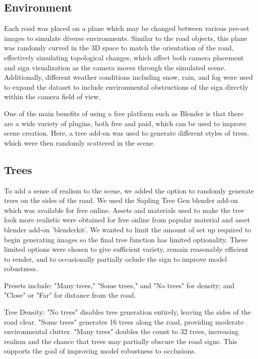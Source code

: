 \documentclass[journal]{IEEEtran}
\begin{document}
\subsection{Environment}
Each road was placed on a plane which may be changed between various pre-set images to simulate diverse environments. Similar to the road objects, this plane was randomly curved in the 3D space to match the orientation of the road, effectively simulating topological changes, which affect both camera placement and sign visualization as the camera moves through the simulated scene. Additionally, different weather conditions including snow, rain, and fog were used to expand the dataset to include environmental obstructions of the sign directly within the camera field of view. 

One of the main benefits of using a free platform such as Blender is that there are a wide variety of plugins, both free and paid, which can be used to improve scene creation. Here, a tree add-on was used to generate different styles of trees, which were then randomly scattered in the scene. 

\subsection{Trees}
To add a sense of realism to the scene, we added the option to randomly generate trees on the sides of the road. We used the Sapling Tree Gen blender add-on which was available for free online. Assets and materials used to make the tree look more realistic were obtained for free online from popular material and asset blender add-on 'blenderkit'. We wanted to limit the amount of set up required to begin generating images so the final tree function has limited optionality. These limited options were chosen to give sufficient variety, remain reasonably efficient to render, and to occasionally partially oclude the sign to improve model robustness. 

Presets include: "Many trees," "Some trees," and "No trees" for density; and "Close" or "Far" for distance from the road.

Tree Density:
"No trees" disables tree generation entirely, leaving the sides of the road clear.
"Some trees" generates 16 trees along the road, providing moderate environmental clutter.
"Many trees" doubles the count to 32 trees, increasing realism and the chance that trees may partially obscure the road signs. This supports the goal of improving model robustness to occlusions.
\end{document}
